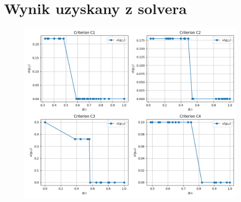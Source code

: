 \documentclass[11pt]{article}
\begin{document}
\section{Wynik uzyskany z solvera}\label{sec:wynik-uzyskany-z-solvera}
\begin{figure}[H]
	\centering
	\includegraphics[scale=0.6]{uta.png}
\end{figure}
\end{document}

